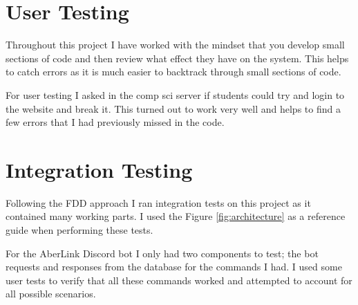 \section{User Testing}
Throughout this project I have worked with the mindset that you develop small sections of code and then review what effect they have on the system. This helps to catch errors as it is much easier to backtrack through small sections of code.

For user testing I asked in the comp sci server if students could try and login to the website and break it. This turned out to work very well and helps to find a few errors that I had previously missed in the code.

\section{Integration Testing}
Following the FDD approach I ran integration tests on this project as it contained many working parts. I used the Figure \ref{fig:architecture} as a reference guide when performing these tests.

For the AberLink Discord bot I only had two components to test; the bot requests and responses from the database for the commands I had. I used some user tests to verify that all these commands worked and attempted to account for all possible scenarios.